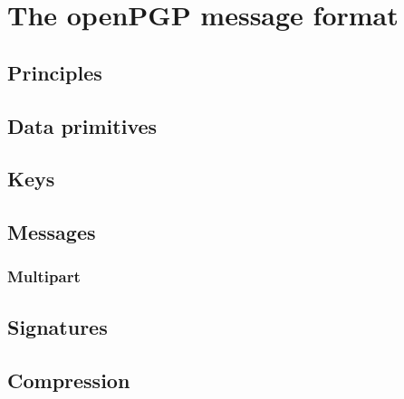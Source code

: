 \chapter{The openPGP message format}

\section{Principles}

\section{Data primitives}

\section{Keys}

\section{Messages}

\subsection{Multipart}

\section{Signatures}

\section{Compression}